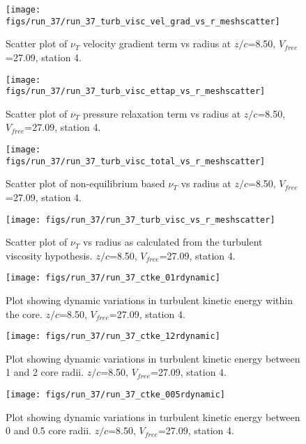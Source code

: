 \begin{figure}[H]
\centering
\texttt{[image: figs/run\_37/run\_37\_turb\_visc\_vel\_grad\_vs\_r\_meshscatter]}
\caption{Scatter plot of $\nu_T$ velocity gradient term vs radius at $z/c$=8.50, $V_{free}$=27.09, station 4.}
\end{figure}


\begin{figure}[H]
\centering
\texttt{[image: figs/run\_37/run\_37\_turb\_visc\_ettap\_vs\_r\_meshscatter]}
\caption{Scatter plot of $\nu_T$ pressure relaxation term vs radius at $z/c$=8.50, $V_{free}$=27.09, station 4.}
\end{figure}


\begin{figure}[H]
\centering
\texttt{[image: figs/run\_37/run\_37\_turb\_visc\_total\_vs\_r\_meshscatter]}
\caption{Scatter plot of non-equilibrium based $\nu_T$ vs radius at $z/c$=8.50, $V_{free}$=27.09, station 4.}
\end{figure}


\begin{figure}[H]
\centering
\texttt{[image: figs/run\_37/run\_37\_turb\_visc\_vs\_r\_meshscatter]}
\caption{Scatter plot of $\nu_T$ vs radius as calculated from the turbulent viscosity hypothesis. $z/c$=8.50, $V_{free}$=27.09, station 4.}
\end{figure}


\begin{figure}[H]
\centering
\texttt{[image: figs/run\_37/run\_37\_ctke\_01rdynamic]}
\caption{Plot showing dynamic variations in turbulent kinetic energy within the core. $z/c$=8.50, $V_{free}$=27.09, station 4.}
\end{figure}


\begin{figure}[H]
\centering
\texttt{[image: figs/run\_37/run\_37\_ctke\_12rdynamic]}
\caption{Plot showing dynamic variations in turbulent kinetic energy between 1 and 2 core radii. $z/c$=8.50, $V_{free}$=27.09, station 4.}
\end{figure}


\begin{figure}[H]
\centering
\texttt{[image: figs/run\_37/run\_37\_ctke\_005rdynamic]}
\caption{Plot showing dynamic variations in turbulent kinetic energy between 0 and 0.5 core radii. $z/c$=8.50, $V_{free}$=27.09, station 4.}
\end{figure}


